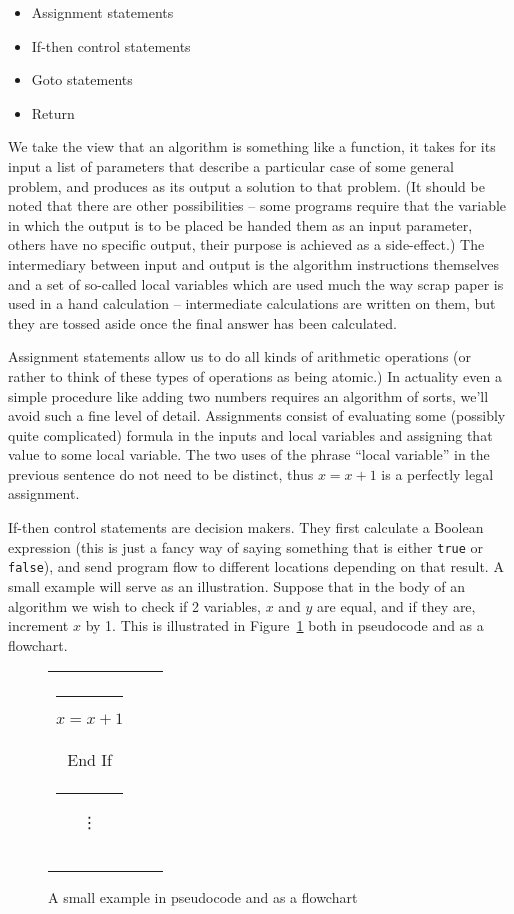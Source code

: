 \begin{itemize}
\item Assignment statements
\item If-then control statements
\item Goto statements
\item Return
\end{itemize}

We take the view that an algorithm is something like a function, it
takes for its input a list of parameters that describe a particular
case of some general problem, and produces as its output a solution to
that problem.  (It should be noted that there are other possibilities
-- some programs require that the variable in which the output is to
be placed be handed them as an input parameter, others have no
specific output, their purpose is achieved as a side-effect.)  The
intermediary between input and output is the algorithm instructions
themselves and a set of so-called local variables which are used much
the way scrap paper is used in a hand calculation -- intermediate
calculations are written on them, but they are tossed aside once the
final answer has been calculated.

Assignment statements allow us to do all kinds of arithmetic
operations (or rather to think of these types of operations as being
atomic.)  In actuality even a simple procedure like adding two numbers
requires an algorithm of sorts, we'll avoid such a fine level of
detail.  Assignments consist of evaluating some (possibly quite
complicated) formula in the inputs and local variables and assigning
that value to some local variable.  The two uses of the phrase ``local
variable''  in the previous sentence do not need to be distinct, thus
$x = x + 1$ is a perfectly legal assignment. 

If-then control statements are decision makers.  They first calculate
a Boolean expression (this is just a fancy way of saying something
that is either {\tt true} or {\tt false}), and send program flow to 
different locations depending on that result.  A small example will
serve as an illustration.  Suppose that in the body of an algorithm we
wish to check if 2 variables, $x$ and $y$ are equal, and if they are,
increment $x$ by 1.  This is illustrated in Figure~\ref{fig:if-then}
both in pseudocode and as a flowchart. 

\begin{figure}[!hbt] 
\begin{tabular}{ccc} 
 
 & \hspace{1in} &
\begin{minipage}[b]{.3\textwidth}
\tt If $x=y$ then \\
\rule{15pt}{0pt}  $x=x+1$ \\
End If \\
\rule{30pt}{0pt} \vdots\\
\\
\\
\end{minipage} \\
\end{tabular}
\caption{A small example in pseudocode and as a flowchart}
\label{fig:if-then}
\end{figure}


